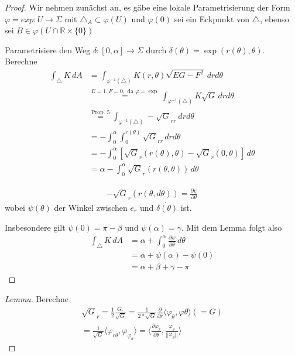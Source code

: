 \documentclass[../main.tex]{subfiles}
\begin{document}
\begin{geometric}
\end{geometric}

\begin{proof}
    Wir nehmen zunächst an, es gäbe eine lokale Parametrisierung der Form
    \(\varphi = exp : U \to \Sigma\) mit \(\triangle_A \subset \varphi(U)\)
    und \(\varphi(0)\) sei ein Eckpunkt von $\triangle$, ebenso sei $B \in \varphi (U\cap \mathbb{R} \times \{0\})$


Parametrisiere den Weg $\delta : [0,\alpha] \to \Sigma$ durch $\delta(\theta) = \exp(r(\theta), \theta)$. Berechne
\begin{align*}
    \int_{\triangle} K \,dA & = \int_{\varphi^{-1}(\triangle)} K(r,\theta) \sqrt{EG-F^{2}}\,drd\theta \\
    & \overset{E=1, F=0, \text{ da } \varphi = \exp}{=}\int_{\varphi^{-1}(\triangle)} K\sqrt{G}  \,drd\theta \\ 
    & \overset{\text{Prop. 5}}{=} \int_{\varphi^{-1}(\triangle)} -\sqrt{G}_{rr} \ drd\theta \\
    & = - \int_{0}^{\alpha} \int_{0}^{r(\theta)} \sqrt{G}_{rr}\,drd\theta \\
    & = - \int_{0}^{\alpha} \left [\sqrt{G}_r (r(\theta), \theta) - \sqrt{G}_r(0,\theta) \right ] \,d\theta \\
    & = \alpha - \int_{0}^{\alpha} \sqrt{G}_r (r(\theta,\theta))  \,d\theta 
\end{align*}

\begin{lemma}
    \begin{align*}
        -\sqrt{G}_r (r(\theta, d\theta)) = \frac{\partial \psi}{\partial \theta}
    \end{align*} wobei $\psi(\theta)$ der Winkel zwischen $e_r$ und $\dot{\delta(\theta)}$ ist.
\end{lemma}
Insbesondere gilt $\psi (0) = \pi - \beta $ und $\psi (\alpha) = \gamma$. Mit dem Lemma folgt also
\begin{align*}
    \int_{\triangle} K  \,dA &= \alpha + \int_{0}^{\alpha} \frac{\partial \psi}{\partial \theta} \,d\theta \\
    &= \alpha + \psi(\alpha) - \psi(0) \\
    &= \alpha + \beta + \gamma - \pi
\end{align*}
\end{proof}

\begin{proof}[Lemma]
    Berechne 
    \begin{align*}
        \sqrt{G}_r = \frac{1}{2} \frac{G_r}{\sqrt{G}} = \frac{1}{2*\sqrt{G}} \frac{\partial}{\partial r} \langle \varphi_{\theta} , \varphi{\theta} \rangle (=G) \\
        = \frac{1}{\sqrt{G}} \langle \varphi_{r\theta}, \varphi_{\varphi_\theta} \rangle = \langle \frac{\partial \varphi _r}{\partial \theta} , \frac{\varphi_{\theta}}{||\varphi _{\theta}||} \rangle
    \end{align*}
\end{proof}
\end{document}
